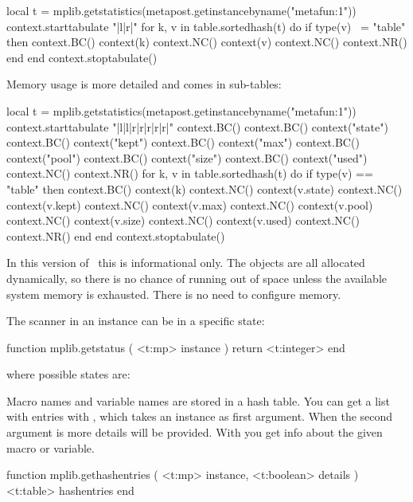 \startthreerows
\startluacode
local t = mplib.getstatistics(metapost.getinstancebyname("metafun:1"))
context.starttabulate { "|l|r|" }
    for k, v in table.sortedhash(t) do
        if type(v) ~= "table" then
            context.BC() context(k)
            context.NC() context(v)
            context.NC() context.NR()
        end
    end
context.stoptabulate()
\stopluacode
\stopthreerows

Memory usage is more detailed and comes in sub-tables:

\startluacode
local t = mplib.getstatistics(metapost.getinstancebyname("metafun:1"))
context.starttabulate { "|l|l|r|r|r|r|r|" }
    context.BC()
    context.BC() context("state")
    context.BC() context("kept")
    context.BC() context("max")
    context.BC() context("pool")
    context.BC() context("size")
    context.BC() context("used")
    context.NC() context.NR()
    for k, v in table.sortedhash(t) do
        if type(v) == "table" then
            context.BC() context(k)
            context.NC() context(v.state)
            context.NC() context(v.kept)
            context.NC() context(v.max)
            context.NC() context(v.pool)
            context.NC() context(v.size)
            context.NC() context(v.used)
            context.NC() context.NR()
        end
    end
context.stoptabulate()
\stopluacode

In this version of \MPLIB\ this is informational only. The objects are all
allocated dynamically, so there is no chance of running out of space unless the
available system memory is exhausted. There is no need to configure memory.

The scanner in an instance can be in a specific state:

\starttyping[option=LUA]
function mplib.getstatus ( <t:mp> instance )
    return <t:integer>
end
\stoptyping

where possible states are:

\startfourrows
\stopfourrows

Macro names and variable names are stored in a hash table. You can get a list
with entries with , which takes an instance as first
argument. When the second argument is  more details will be provided.
With  you get info about the given macro or variable.

\starttyping[option=LUA]
function mplib.gethashentries ( <t:mp> instance, <t:boolean> details )
    <t:table> hashentries
end
\stoptyping

